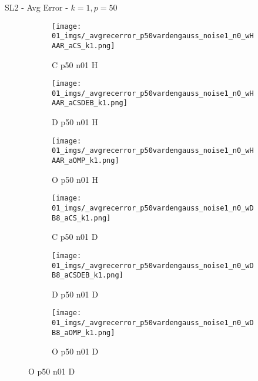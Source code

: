 \begin{frame}{SL2 - Avg Error - $k=1,p=50$}{}
\begin{figure}
\begin{subfigure}{0.13\textwidth}
\texttt{[image: 01\_imgs/\_avgrecerror\_p50vardengauss\_noise1\_n0\_wHAAR\_aCS\_k1.png]}
\caption*{\tiny C p50 n01 H}
\end{subfigure}
\begin{subfigure}{0.13\textwidth}
\texttt{[image: 01\_imgs/\_avgrecerror\_p50vardengauss\_noise1\_n0\_wHAAR\_aCSDEB\_k1.png]}
\caption*{\tiny D p50 n01 H}
\end{subfigure}
\begin{subfigure}{0.13\textwidth}
\texttt{[image: 01\_imgs/\_avgrecerror\_p50vardengauss\_noise1\_n0\_wHAAR\_aOMP\_k1.png]}
\caption*{\tiny O p50 n01 H}
\end{subfigure}
\begin{subfigure}{0.13\textwidth}
\texttt{[image: 01\_imgs/\_avgrecerror\_p50vardengauss\_noise1\_n0\_wDB8\_aCS\_k1.png]}
\caption*{\tiny C p50 n01 D}
\end{subfigure}
\begin{subfigure}{0.13\textwidth}
\texttt{[image: 01\_imgs/\_avgrecerror\_p50vardengauss\_noise1\_n0\_wDB8\_aCSDEB\_k1.png]}
\caption*{\tiny D p50 n01 D}
\end{subfigure}
\begin{subfigure}{0.13\textwidth}
\texttt{[image: 01\_imgs/\_avgrecerror\_p50vardengauss\_noise1\_n0\_wDB8\_aOMP\_k1.png]}
\caption*{\tiny O p50 n01 D}
\end{subfigure}

\vspace{5pt}


\end{figure}
\end{frame}
